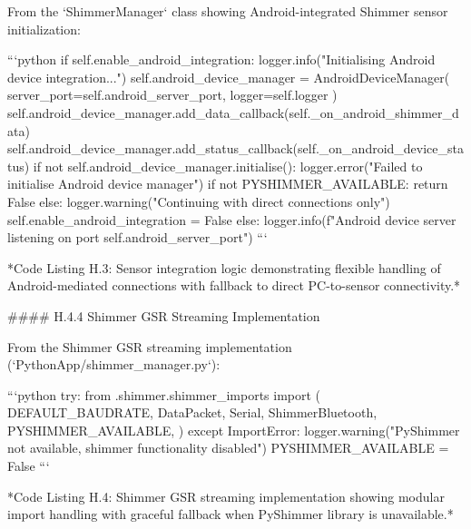 \documentclass[12pt,a4paper]{article}
\begin{document}
{From the `ShimmerManager` class showing Android-integrated Shimmer sensor initialization:

```python
if self.enable_android_integration:
    logger.info("Initialising Android device integration...")
    self.android_device_manager = AndroidDeviceManager(
        server_port=self.android_server_port,
        logger=self.logger
    )
    self.android_device_manager.add_data_callback(self._on_android_shimmer_data)
    self.android_device_manager.add_status_callback(self._on_android_device_status)
    if not self.android_device_manager.initialise():
        logger.error("Failed to initialise Android device manager")
        if not PYSHIMMER_AVAILABLE:
            return False
        else:
            logger.warning("Continuing with direct connections only")
            self.enable_android_integration = False
    else:
        logger.info(f"Android device server listening on port {self.android_server_port}")
```

*Code Listing H.3: Sensor integration logic demonstrating flexible handling of Android-mediated connections with fallback to direct PC-to-sensor connectivity.*

#### H.4.4 Shimmer GSR Streaming Implementation

From the Shimmer GSR streaming implementation (`PythonApp/shimmer_manager.py`):

```python
try:
    from .shimmer.shimmer_imports import (
        DEFAULT_BAUDRATE,
        DataPacket,
        Serial,
        ShimmerBluetooth,
        PYSHIMMER_AVAILABLE,
    )
except ImportError:
    logger.warning("PyShimmer not available, shimmer functionality disabled")
    PYSHIMMER_AVAILABLE = False
```

*Code Listing H.4: Shimmer GSR streaming implementation showing modular import handling with graceful fallback when PyShimmer library is unavailable.*

}
\end{document}
